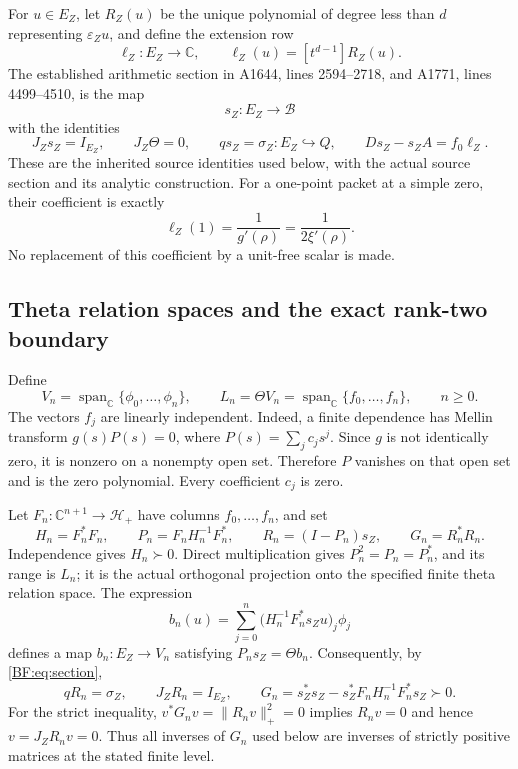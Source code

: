 For \(u\in E_Z\), let \(R_Z(u)\) be the unique polynomial of degree
less than \(d\) representing \(\varepsilon_Zu\), and define the
extension row
\begin{equation}
\ell_Z:E_Z\longrightarrow\mathbb C,\qquad
\ell_Z(u)=[t^{d-1}]R_Z(u).
\tag{BF.05}\label{BF:eq:extension-row}
\end{equation}
The established arithmetic section in A1644, lines 2594--2718, and
A1771, lines 4499--4510, is the map
\[
s_Z:E_Z\longrightarrow\mathcal B
\]
with the identities
\begin{equation}
J_Zs_Z=I_{E_Z},\qquad J_Z\Theta=0,\qquad
qs_Z=\sigma_Z:E_Z\hookrightarrow Q,\qquad
Ds_Z-s_ZA=f_0\ell_Z.
\tag{BF.06}\label{BF:eq:section}
\end{equation}
These are the inherited source identities used below, with the actual
source section and its analytic construction.  For a one-point packet
at a simple zero, their coefficient is exactly
\[
\ell_Z(1)=\frac{1}{g'(\rho)}
         =\frac{1}{2\xi'(\rho)}.
\]
No replacement of this coefficient by a unit-free scalar is made.

\subsection{Theta relation spaces and the exact rank-two boundary}
\label{BF:rank-two}

Define
\begin{equation}
V_n=\operatorname{span}_{\mathbb C}\{\phi_0,\ldots,\phi_n\},
\qquad
L_n=\Theta V_n
   =\operatorname{span}_{\mathbb C}\{f_0,\ldots,f_n\},
\qquad n\ge0.
\tag{BF.07}\label{BF:eq:relation-spaces}
\end{equation}
The vectors \(f_j\) are linearly independent.  Indeed, a finite
dependence has Mellin transform \(g(s)P(s)=0\), where
\(P(s)=\sum_jc_js^j\).  Since \(g\) is not identically zero, it is
nonzero on a nonempty open set.  Therefore \(P\) vanishes on that
open set and is the zero polynomial.  Every coefficient \(c_j\)
is zero.

Let \(F_n:\mathbb C^{n+1}\to\mathcal H_+\) have columns
\(f_0,\ldots,f_n\), and set
\begin{equation}
H_n=F_n^*F_n,\qquad
P_n=F_nH_n^{-1}F_n^*,\qquad
R_n=(I-P_n)s_Z,\qquad
G_n=R_n^*R_n.
\tag{BF.08}\label{BF:eq:representatives}
\end{equation}
Independence gives \(H_n\succ0\).  Direct multiplication gives
\(P_n^2=P_n=P_n^*\), and its range is \(L_n\); it is the actual
orthogonal projection onto the specified finite theta relation space.
The expression
\[
b_n(u)=\sum_{j=0}^n
\bigl(H_n^{-1}F_n^*s_Zu\bigr)_j\phi_j
\]
defines a map \(b_n:E_Z\to V_n\) satisfying \(P_ns_Z=\Theta b_n\).
Consequently, by \eqref{BF:eq:section},
\begin{equation}
qR_n=\sigma_Z,\qquad J_ZR_n=I_{E_Z},\qquad
G_n=s_Z^*s_Z-s_Z^*F_nH_n^{-1}F_n^*s_Z\succ0.
\tag{BF.09}\label{BF:eq:exact-class}
\end{equation}
For the strict inequality, \(v^*G_nv=\|R_nv\|_+^2=0\) implies
\(R_nv=0\) and hence \(v=J_ZR_nv=0\).  Thus all inverses of \(G_n\)
used below are inverses of strictly positive matrices at the stated
finite level.

